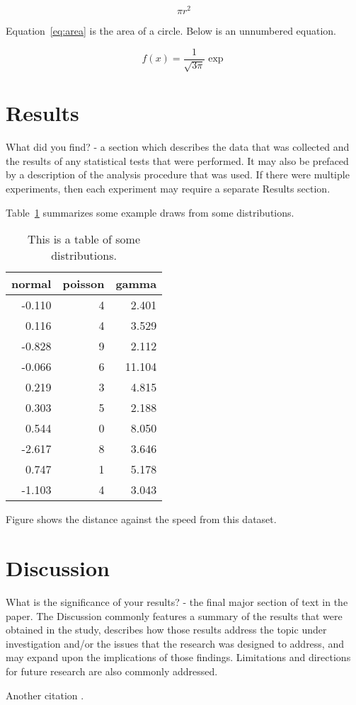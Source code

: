 \documentclass[12pt]{article}
\begin{document}
\begin{equation}
	\label{eq:area}
	\pi r^2
\end{equation}

Equation~\eqref{eq:area} is the area of a circle. Below is an unnumbered equation.

\[
f(x)=\frac{1}{\sqrt{3\pi}}\exp
\]

\section{Results}

What did you find? - a section which describes the data that was collected and the results of any statistical tests that were performed.  It may also be prefaced by a description of the analysis procedure that was used. If there were multiple experiments, then each experiment may require a separate Results section.

Table~\ref{tab:rv} summarizes some example draws from some distributions.



\begin{table}[ht]
  \caption{This is a table of some distributions.}
  \label{tab:rv}
\centering
\begin{tabular}{rrr}
  \toprule
normal & poisson & gamma \\ 
  \midrule
-0.110 & 4 & 2.401 \\ 
  0.116 & 4 & 3.529 \\ 
  -0.828 & 9 & 2.112 \\ 
  -0.066 & 6 & 11.104 \\ 
  0.219 & 3 & 4.815 \\ 
  0.303 & 5 & 2.188 \\ 
  0.544 & 0 & 8.050 \\ 
  -2.617 & 8 & 3.646 \\ 
  0.747 & 1 & 5.178 \\ 
  -1.103 & 4 & 3.043 \\ 
   \bottomrule
\end{tabular}
\end{table}

Figure shows the distance against the speed from this dataset.


\section{Discussion}
What is the significance of your results? - the final major section of text in the paper.  The Discussion commonly features a summary of the results that were obtained in the study, describes how those results address the topic under investigation and/or the issues that the research was designed to address, and may expand upon the implications of those findings.  Limitations and directions for future research are also commonly addressed.

Another citation \citep{srinath2017python}.



\end{document}
